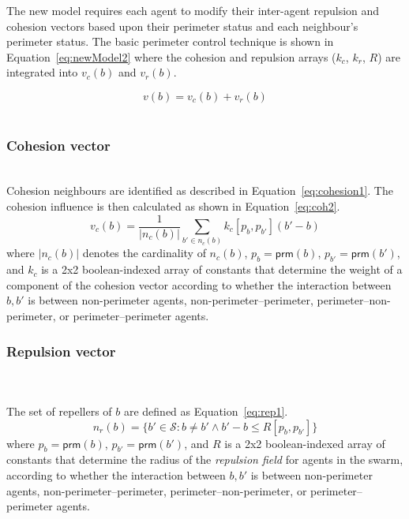 \documentclass[12pt,a4paper]{IEEEtran}
\newcommand{\vbb}[2]{#2-#1}
\newcommand{\prm}{\mathsf{prm}}
\newcommand{\kc}{\mathit{k_c}}
\newcommand{\kr}{\mathit{k_r}}
\newcommand{\rb}{\mathit{R}}
\begin{document}
The new model requires each agent to modify their inter-agent repulsion and cohesion vectors based upon their perimeter status and each neighbour's perimeter status. The basic perimeter control technique is shown in Equation~\ref{eq:newModel2} where the cohesion and repulsion arrays ($\kc$, $\kr$, $\rb$) are integrated into $v_c(b)$ and $v_r(b)$.

\begin{equation}\label{eq:newModel2}
v(b) = v_c(b) + v_r(b)
\end{equation}\\

\subsubsection{Cohesion vector}~\\
Cohesion neighbours are identified as  described in Equation~\ref{eq:cohesion1}. The cohesion influence is then calculated as shown in Equation~\ref{eq:coh2}.
\begin{equation}\label{eq:coh2}
	v_c(b) = \frac{1}{|n_c(b)|} \sum_{b' \in n_c(b)} \kc[p_b, p_{b'}] (b' - b)
\end{equation}
where $|n_c(b)|$ denotes the cardinality of $n_c(b)$, $p_b = \prm(b)$, $p_{b'} 
= \prm(b')$, and 
$\kc$ is a 2x2 boolean-indexed array of constants that determine the weight
of a component of the cohesion vector according to
whether the interaction between $b,b'$ is between non-perimeter agents,
non-perimeter--perimeter, perimeter--non-perimeter, or perimeter--perimeter
agents.

\subsubsection{Repulsion vector}~\\
~\\
The set of repellers of $b$ are defined as Equation~\ref{eq:rep1}.
\small
\begin{equation}\label{eq:rep1}
	n_r(b) = \{b' \in \mathcal{S} : b \neq b' \wedge \vbb{b}{b'} \leq \rb[p_b,p_{b'}]\}
\end{equation}
\normalsize
where $p_b = \prm(b)$, $p_{b'} = \prm(b')$, and $\rb$ is a 2x2 boolean-indexed
array of constants that determine the radius of the \emph{repulsion field} for agents in the swarm, according to whether the interaction between $b,b'$ is between non-perimeter agents, non-perimeter--perimeter,
perimeter--non-perimeter, or perimeter--perimeter agents.\\
\end{document}
